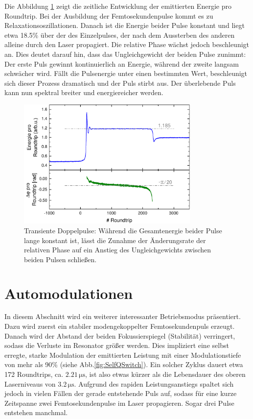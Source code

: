 \documentclass[bachelor,       %
               twoside,        %
               BCOR10mm,       %
               liststotoc,nomtotoc,bibtotoc, %
               english,ngerman, %
               final,          %
               ]{GAUBM}
\begin{document}
Die Abbildung \ref{fig:TransientSplittingAusw} zeigt die zeitliche Entwicklung der emittierten Energie pro Roundtrip.
Bei der Ausbildung der Femtosekundenpulse kommt es zu Relaxationsoszillationen.
Danach ist die Energie beider Pulse konstant und liegt etwa 18.5\% über der des Einzelpulses, der nach dem Aussterben des anderen alleine durch den Laser propagiert.
Die relative Phase wächst jedoch beschleunigt an.
Dies deutet darauf hin, dass das Ungleichgewicht der beiden Pulse zunimmt: Der erste Puls gewinnt kontinuierlich an Energie, während der zweite langsam schwächer wird.
Fällt die Pulsenergie unter einen bestimmten Wert, beschleunigt sich dieser Prozess dramatisch und der Puls stirbt aus.
Der überlebende Puls kann nun spektral breiter und energiereicher werden.
\begin{figure}[!htb]
	\centering
	\includegraphics[width=0.8\textwidth]{figures/TransientSplittingAusw}
	\caption{Transiente Doppelpulse: Während die Gesamtenergie beider Pulse lange konstant ist, lässt die Zunahme der Änderungsrate der relativen Phase auf ein Anstieg des Ungleichgewichts zwischen beiden Pulsen schließen.}
	\label{fig:TransientSplittingAusw}
\end{figure}

\clearpage
\section{Automodulationen}
In diesem Abschnitt wird ein weiterer interessanter Betriebsmodus präsentiert.
Dazu wird zuerst ein stabiler modengekoppelter Femtosekundenpuls erzeugt.
Danach wird der Abstand der beiden Fokussierspiegel (Stabilität) verringert, sodass die Verluste im Resonator größer werden.
Dies impliziert eine selbst erregte, starke Modulation der emittierten Leistung mit einer Modulationstiefe von mehr als 90\% (siehe Abb.\ref{fig:SelfQSwitch}).
Ein solcher Zyklus dauert etwa 172 Roundtrips, ca. $2.21\,\si{\micro\second}$, ist also etwas kürzer als die Lebensdauer des oberen Laserniveaus von $3.2\,\si{\micro\second}$.
Aufgrund des rapiden Leistungsanstiegs spaltet sich jedoch in vielen Fällen der gerade entstehende Puls auf, sodass für eine kurze Zeitspanne zwei Femtosekundenpulse im Laser propagieren.
Sogar drei Pulse entstehen manchmal.
\end{document}
